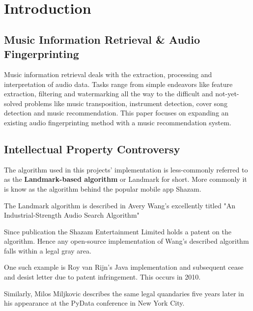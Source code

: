 \chapter{Introduction}

\ifpdf
    \graphicspath{{1_introduction/figures/PNG/}{1_introduction/figures/PDF/}{1_introduction/figures/}}
\else
    \graphicspath{{1_introduction/figures/EPS/}{1_introduction/figures/}}
\fi


\section{Music Information Retrieval \& Audio Fingerprinting} %

Music information retrieval deals with the extraction, processing and interpretation of audio data. Tasks range from simple endeavors like feature extraction, filtering and watermarking all the way to the difficult and not-yet-solved problems like music transposition, instrument detection, cover song detection and music recommendation.\cite{mir}
This paper focuses on expanding an existing audio fingerprinting method with a music recommendation system.
 
\section{Intellectual Property Controversy} 

The algorithm used in this projects' implementation is less-commonly referred to as the \textbf{Landmark-based algorithm} or Landmark for short. More commonly it is know as the algorithm behind the popular mobile app Shazam.\cite{shazam}

The Landmark algorithm is described in Avery Wang's excellently titled "An Industrial-Strength Audio Search Algorithm"\cite{avery_shaz}

Since publication the Shazam Entertainment Limited holds a patent on the algorithm. Hence any open-source implementation of Wang's described algorithm falls within a legal gray area.


One such example is Roy van Rijn's Java implementation and subsequent cease and desist letter due to patent infringement. This occurs in 2010. \cite{roy_infringement}

Similarly, Milos Miljkovic describes the same legal quandaries five years later in his appearance at the PyData conference in New York City. \cite{milos}

